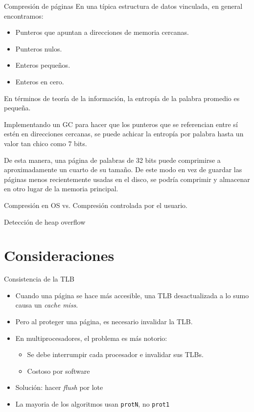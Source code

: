 \documentclass[xcolor=pdftex,dvipsnames,usenames,table]{beamer}
\begin{document}
\begin{frame}{Compresión de páginas}
\pause En una típica estructura de datos vinculada, en general encontramos:
	\pause
	\begin{itemize}
		\item Punteros que apuntan a direcciones de memoria cercanas.
		\item Punteros nulos.
		\item Enteros pequeños.
		\item Enteros en cero.
	\end{itemize}

\pause En términos de teoría de la información, la entropía de la palabra promedio es pequeña.

\pause Implementando un GC para hacer que los punteros que se referencian entre sí estén en direcciones cercanas, se puede achicar la entropía por palabra hasta un valor tan chico como 7 bits.

\pause De esta manera, una página de palabras de 32 bits puede comprimirse a aproximadamente un cuarto de su tamaño. De este modo en vez de guardar las páginas menos recientemente usadas en el disco, se podría comprimir y almacenar en otro lugar de la memoria principal.

\pause Compresión en OS vs. Compresión controlada por el usuario.

\end{frame}

\begin{frame}{Detección de heap overflow}
\end{frame}

\section{Consideraciones}

\begin{frame}{Consistencia de la TLB}
  \begin{itemize}
    \item Cuando una página se hace más accesible, una TLB desactualizada a lo
          sumo causa un \textit{cache miss}.
    \item Pero al proteger una página, es necesario invalidar la TLB.
    \item En multiprocesadores, el problema es más notorio:
    \begin{itemize}
      \item Se debe interrumpir cada procesador e invalidar sus TLBs.
      \item Costoso por software
    \end{itemize}
    \item Solución: hacer \textit{flush} por lote
    \item La mayoria de los algoritmos usan \texttt{protN}, no \texttt{prot1}
  \end{itemize}
\end{frame}
\end{document}
